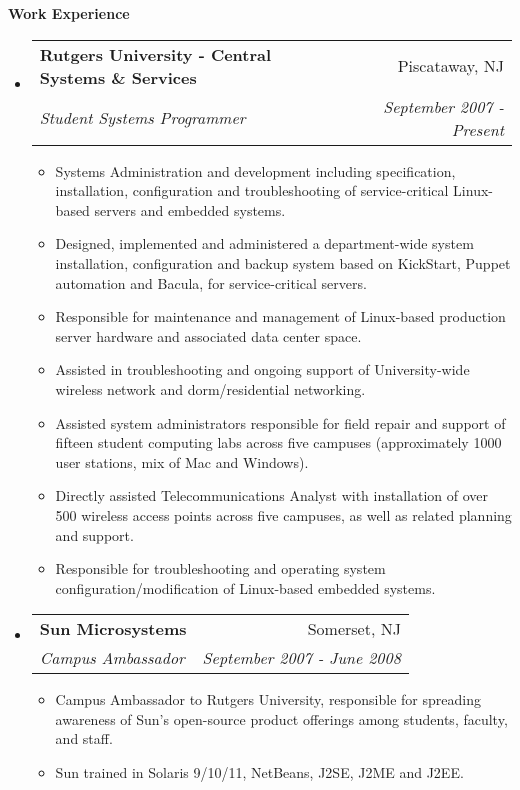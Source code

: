 \documentclass[letterpaper,11pt]{article}
\makeatletter
\newcommand{\resitem}[1]{\item #1 \vspace{-2pt}}
\newcommand{\resheading}[1]{{\large \colorbox{mygrey}{\begin{minipage}{\textwidth}{\textbf{#1 \vphantom{p\^{E}}}}\end{minipage}}}}
\newcommand{\ressubheading}[4]{
\begin{tabular*}{7.0in}{l@{\extracolsep{\fill}}r}
		\textbf{#1} & #2 \\
		\textit{#3} & \textit{#4} \\
\end{tabular*}\vspace{-6pt}}
\makeatother
\begin{document}
\resheading{Work Experience}
\begin{itemize}
\item
	\ressubheading{Rutgers University - Central Systems \& Services}{Piscataway, NJ}{Student Systems Programmer}{September 2007 - Present}
	\begin{itemize}
                \resitem{Systems Administration and development including specification,
                  installation, configuration and troubleshooting of service-critical
                  Linux-based servers and embedded systems.}
                \resitem{Designed, implemented and administered a department-wide system
                  installation, configuration and backup system based on
                  KickStart, Puppet automation and Bacula, for
                  service-critical servers.}
                \resitem{Responsible for maintenance and management of
                  Linux-based production server hardware and associated data center space.}
                \resitem{Assisted in troubleshooting and ongoing support of
                  University-wide wireless network and dorm/residential networking.}
                \resitem{Assisted system administrators responsible for field
                  repair and support of fifteen student computing 
                  labs across five campuses (approximately 1000 user stations,
                  mix of Mac and Windows).}
                \resitem{Directly assisted Telecommunications Analyst with
                  installation of over 500 wireless access
                  points across five campuses, as well as related planning and
                  support.}
                \resitem{Responsible for troubleshooting and operating system
                  configuration/modification of Linux-based embedded systems.}

	\end{itemize}

\item
        \ressubheading{Sun Microsystems}{Somerset, NJ}{Campus Ambassador}{September 2007 - June 2008}
        \begin{itemize}
                \resitem{Campus Ambassador to Rutgers University, responsible
                  for spreading awareness of Sun's open-source product
                  offerings among students, faculty, and staff.}
                \resitem{Sun trained in Solaris 9/10/11,
                  NetBeans, J2SE, J2ME and J2EE. }
        \end{itemize}


\end{itemize}
\end{document}
